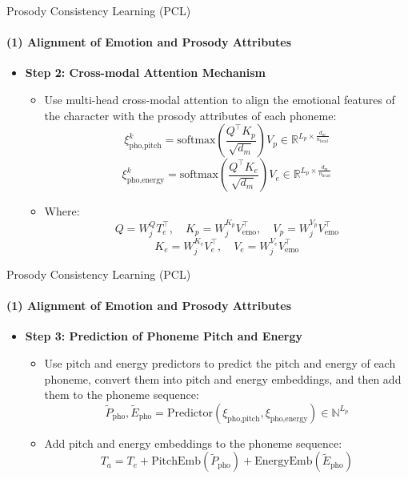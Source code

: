 \begin{frame}{Prosody Consistency Learning (PCL)}
\framesubtitle{(1) Alignment of Emotion and Prosody Attributes}

\begin{itemize}
    \item \textbf{Step 2: Cross-modal Attention Mechanism}
    \begin{itemize}
    \item Use multi-head cross-modal attention to align the emotional features of the character with the prosody attributes of each phoneme:
        \begin{equation}
            \xi_{\text{pho,pitch}}^k = \text{softmax}\left(\frac{Q^{\top} K_p}{\sqrt{d_m}}\right) V_p \in \mathbb{R}^{L_p \times \frac{d_m}{n_{\text{head}}}}
        \end{equation}
        \begin{equation}
            \xi_{\text{pho,energy}}^k = \text{softmax}\left(\frac{Q^{\top} K_e}{\sqrt{d_m}}\right) V_e \in \mathbb{R}^{L_p \times \frac{d_m}{n_{\text{head}}}}
        \end{equation}
        \item Where:
        \begin{equation}
            Q = W_j^Q T_e^{\top}, \quad K_p = W_j^{K_p} V_{\text{emo}}^{\top}, \quad V_p = W_j^{V_p} V_{\text{emo}}^{\top}
        \end{equation}
        \begin{equation}
            K_e = W_j^{K_e} V_e^{\top}, \quad V_e = W_j^{V_e} V_{\text{emo}}^{\top}
        \end{equation}
    \end{itemize}
\end{itemize}
\end{frame}


\begin{frame}{Prosody Consistency Learning (PCL)}
\framesubtitle{(1) Alignment of Emotion and Prosody Attributes}

\begin{itemize}
    \item  \textbf{Step 3: Prediction of Phoneme Pitch and Energy}
    \begin{itemize}
        \item Use pitch and energy predictors to predict the pitch and energy of each phoneme, convert them into pitch and energy embeddings, and then add them to the phoneme sequence:
        \begin{equation}
            \tilde{P}_{\text{pho}}, \tilde{E}_{\text{pho}} = \text{Predictor}(\xi_{\text{pho,pitch}}, \xi_{\text{pho,energy}}) \in \mathbb{N}^{L_p}
        \end{equation}
        \item Add pitch and energy embeddings to the phoneme sequence:
        \begin{equation}
            T_a = T_e + \text{PitchEmb}(\tilde{P}_{\text{pho}}) + \text{EnergyEmb}(\tilde{E}_{\text{pho}})
        \end{equation}
    \end{itemize}
\end{itemize}
\end{frame}


